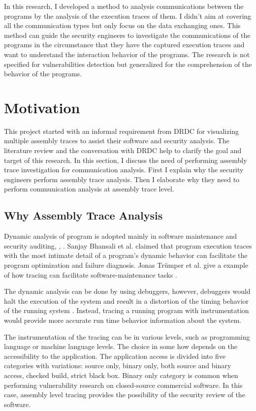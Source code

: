 In this research, I developed a method to analysis communications between the programs by the analysis of the execution traces of them. I didn't aim at covering all the communication types but only focus on the data exchanging ones. This method can guide the security engineers to investigate the communications of the programs in the circumstance that they have the captured execution traces and want to understand the interaction behavior of the programs. The research is not specified for vulnerabilities detection but generalized for the comprehension of the behavior of the programs.

\section{Motivation}
This project started with an informal requirement from DRDC for visualizing multiple assembly traces to assist their software and security analysis. The literature review and the conversation with DRDC help to clarify the goal and target of this research. In this section, I discuss the need of performing assembly trace investigation for communication analysis. First I explain why the security engineers perform assembly trace analysis. Then I elaborate why they need to perform communication analysis at assembly trace level. 

\subsection{Why Assembly Trace Analysis}
Dynamic analysis of program is adopted mainly in software maintenance and security auditing\cite{zhang2010detecting}, \cite{cai2016sworddta}, \cite{somorovsky2016systematic}. Sanjay Bhansali et al. claimed that program execution traces with the most intimate detail of a program's dynamic behavior can facilitate the program optimization and failure diagnosis. Jonas Tr{\"u}mper et al. give a example of how tracing can facilitate software-maintenance tasks \cite{trumper2012maintenance}.

The dynamic analysis can be done by using debuggers, however, debuggers would halt the execution of the system and result in a distortion of the timing behavior of the running system \cite{trumper2012maintenance}. Instead, tracing a running program with instrumentation would provide more accurate run time behavior information about the system.

The instrumentation of the tracing can be in various levels, such as programming language or machine language levels. The choice in some how depends on the accessibility to the application. The application access is divided into five categories with variations: source only, binary only, both source and binary access, checked build, strict black box. Binary only category is common when performing vulnerability research on closed-source commercial software.\cite{dowd_art_2006} In this case, assembly level tracing provides the possibility of the security review of the software.

